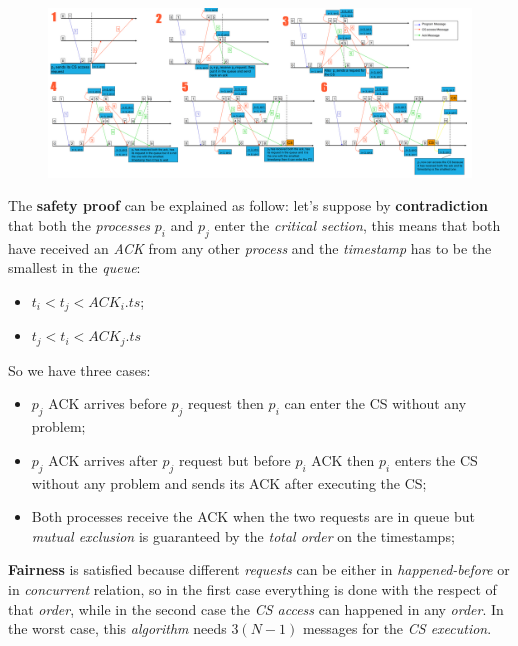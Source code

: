 \documentclass{article}
\begin{document}
\begin{figure}[H]
  \centering
  \includegraphics[scale=0.265]{cattura17.png}
\end{figure}
The \textbf{safety proof} can be explained as follow: let's suppose by \textbf{contradiction} that both the \emph{processes} $p_i$ and $p_j$ enter the \emph{critical section}, this means that both have received an \emph{ACK} from any other \emph{process} and the \emph{timestamp} has to be the smallest in the \emph{queue}:
\begin{itemize}
\item $t_i < t_j < ACK_i.ts$;
\item $t_j < t_i < ACK_j.ts$
\end{itemize}
So we have three cases:
\begin{itemize}
\item $p_j$ ACK arrives before $p_j$ request then $p_i$ can enter the CS without any problem;
\item $p_j$ ACK arrives after $p_j$ request but before $p_i$ ACK then $p_i$ enters the CS without any problem and sends its ACK after executing the CS;
\item Both processes receive the ACK when the two requests are in queue but \emph{mutual exclusion} is guaranteed by the \emph{total order} on the timestamps;
\end{itemize}
\textbf{Fairness} is satisfied because different \emph{requests} can be either in \emph{happened-before} or in \emph{concurrent} relation, so in the first case everything is done with the respect of that \emph{order}, while in the second case the \emph{CS access} can happened in any \emph{order}. In the worst case, this \emph{algorithm} needs $3(N-1)$ messages for the\emph{ CS execution}. 
\end{document}
